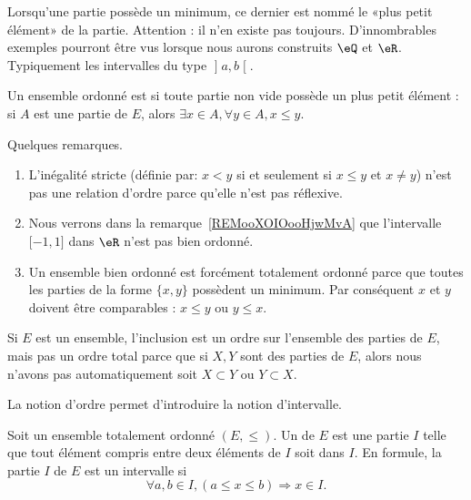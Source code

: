 Lorsqu'une partie possède un minimum, ce dernier est nommé le «plus petit élément» de la partie. Attention : il n'en existe pas toujours. D'innombrables exemples pourront être vus lorsque nous aurons construits \( \eQ\) et \( \eR\). Typiquement les intervalles du type \( \mathopen] a , b \mathclose[\).

\begin{definition}   \label{DEFooLJEAooBLGsiS}
    Un ensemble ordonné est  si toute partie non vide possède un plus petit élément : si \( A\) est une partie de \( E\), alors \( \exists x\in A,\forall y\in A, x\leq y\).
\end{definition}

\begin{normaltext}
    Quelques remarques.
    \begin{enumerate}
        \item
            L'inégalité stricte (définie par: \( x<y\) si et seulement si \( x\leq y\) et \( x\neq y\)) n'est pas une relation d'ordre parce qu'elle n'est pas réflexive.
        \item
            Nous verrons dans la remarque~\ref{REMooXOIOooHjwMvA} que l'intervalle \( \mathopen[ -1 , 1 \mathclose]\) dans \( \eR\) n'est pas bien ordonné.
        \item
            Un ensemble bien ordonné est forcément totalement ordonné parce que toutes les parties de la forme \( \{ x,y \}\) possèdent un minimum. Par conséquent \( x\) et \( y\) doivent être comparables : \( x\leq y\) ou \( y\leq x\).
    \end{enumerate}
\end{normaltext}

\begin{example}
    Si \( E\) est un ensemble, l'inclusion est un ordre sur l'ensemble des parties de \( E\), mais pas un ordre total parce que si \( X,Y\) sont des parties de \( E\), alors nous n'avons pas automatiquement soit \( X\subset Y\) ou \( Y\subset X\).
\end{example}

La notion d'ordre permet d'introduire la notion d'intervalle.

\begin{definition}  \label{DefEYAooMYYTz}
    Soit un ensemble totalement ordonné \( (E,\leq)\). Un  de \( E\) est une partie \( I\) telle que tout élément compris entre deux éléments de \( I \) soit dans \( I \). En formule, la partie \( I \) de \( E\) est un intervalle si
    \[
      \forall a,b\in I,(a\leq x\leq b)\Rightarrow x\in I.
    \]
\end{definition}

